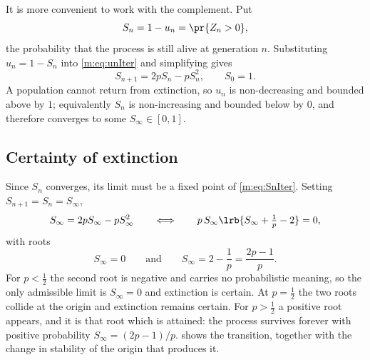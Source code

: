 It is more convenient to work with the complement. Put
\begin{equation*}
S_n = 1-u_n = \pr{Z_n>0},
\end{equation*}
the probability that the process is still alive at generation $n$. Substituting
$u_n = 1-S_n$ into \cref{m:eq:unIter} and simplifying gives
\begin{equation}
\label{m:eq:SnIter}
S_{n+1} = 2pS_n - pS_n^2,\qquad S_0 = 1 .
\end{equation}
A population cannot return from extinction, so $u_n$ is non-decreasing and bounded
above by $1$; equivalently $S_n$ is non-increasing and bounded below by $0$, and
therefore converges to some $S_\infty\in[0,1]$.

\subsection{Certainty of extinction}
\label{m:sec:certainty}

Since $S_n$ converges, its limit must be a fixed point of \cref{m:eq:SnIter}. Setting
$S_{n+1}=S_n=S_\infty$,
\begin{equation*}
S_\infty = 2pS_\infty - pS_\infty^2
\qquad\Longleftrightarrow\qquad
p\,S_\infty\lrb{S_\infty + \tfrac1p - 2} = 0 ,
\end{equation*}
with roots
\begin{equation*}
S_\infty = 0
\qquad\text{and}\qquad
S_\infty = 2-\frac1p = \frac{2p-1}{p} .
\end{equation*}
For $p<\tfrac12$ the second root is negative and carries no probabilistic meaning,
so the only admissible limit is $S_\infty=0$ and extinction is certain. At
$p=\tfrac12$ the two roots collide at the origin and extinction remains certain.
For $p>\tfrac12$ a positive root appears, and it is that root which is attained:
the process survives forever with positive probability
$S_\infty = (2p-1)/p$.  shows the transition, together
with the change in stability of the origin that produces it.

